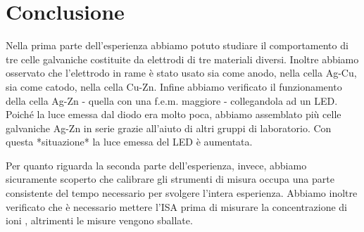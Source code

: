 \section*{Conclusione}

Nella prima parte dell'esperienza abbiamo potuto studiare il comportamento di tre celle galvaniche costituite da elettrodi di tre materiali diversi.
Inoltre abbiamo osservato che l'elettrodo in rame è stato usato sia come anodo, nella cella Ag-Cu, sia come catodo, nella cella Cu-Zn.
Infine abbiamo verificato il funzionamento della cella Ag-Zn - quella con una f.e.m. maggiore - collegandola ad un LED.
Poiché la luce emessa dal diodo era molto poca, abbiamo assemblato più celle galvaniche Ag-Zn in serie grazie all'aiuto di altri gruppi di laboratorio.
Con questa *situazione* la luce emessa del LED è aumentata.

Per quanto riguarda la seconda parte dell'esperienza, invece, abbiamo sicuramente scoperto che calibrare gli strumenti di misura occupa una parte consistente del tempo necessario per svolgere l'intera esperienza.
Abbiamo inoltre verificato che è necessario mettere l'ISA prima di misurare la concentrazione di ioni , altrimenti le misure vengono sballate.
